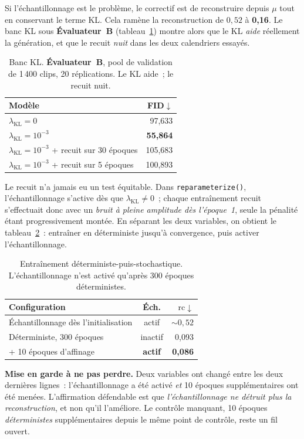 \documentclass[12pt,a4paper,oneside]{report}
\theoremstyle{definition}
\theoremstyle{plain}
\newcommand{\rc}{\mathrm{rc}}
\newcommand{\lkl}{\ensuremath{\lambda_{\mathrm{KL}}}}
\begin{document}
Si l'échantillonnage est le problème, le correctif est de reconstruire depuis
$\mu$ tout en conservant le terme KL. Cela ramène la reconstruction de $0{,}52$ à
\textbf{0,16}. Le banc KL sous \textbf{Évaluateur~B} (tableau~\ref{tab:klbench})
montre alors que le KL \emph{aide} réellement la génération, et que le recuit
\emph{nuit} dans les deux calendriers essayés.

\begin{table}[ht]
\centering
\caption{Banc KL. \textbf{Évaluateur~B}, pool de validation de 1\,400 clips, 20
réplications. Le KL aide~; le recuit nuit.}
\label{tab:klbench}
\small
\begin{tabular}{@{}lr@{}}
\toprule
Modèle & FID$\downarrow$ \\
\midrule
$\lkl=0$ & 97,633 \\
$\lkl=10^{-3}$ & \textbf{55,864} \\
$\lkl=10^{-3}$ + recuit sur 30 époques & 105,683 \\
$\lkl=10^{-3}$ + recuit sur 5 époques & 100,893 \\
\bottomrule
\end{tabular}
\end{table}

Le recuit n'a jamais eu un test équitable. Dans \texttt{reparameterize()},
l'échantillonnage s'active dès que $\lkl\neq0$~; chaque entraînement recuit
s'effectuait donc avec un \emph{bruit à pleine amplitude dès l'époque~1}, seule la
pénalité étant progressivement montée. En séparant les deux variables, on obtient
le tableau~\ref{tab:detstoch}~: entraîner en déterministe jusqu'à convergence,
puis activer l'échantillonnage.

\begin{table}[ht]
\centering
\caption{Entraînement déterministe-puis-stochastique. L'échantillonnage n'est
activé qu'après 300 époques déterministes.}
\label{tab:detstoch}
\small
\begin{tabular}{@{}lcr@{}}
\toprule
Configuration & Éch. & $\rc\downarrow$ \\
\midrule
Échantillonnage dès l'initialisation & actif & ${\sim}0,52$ \\
Déterministe, 300 époques & inactif & 0,093 \\
\quad + 10 époques d'affinage & \textbf{actif} & \textbf{0,086} \\
\bottomrule
\end{tabular}
\end{table}

\begin{encadre}
\textbf{Mise en garde à ne pas perdre.} Deux variables ont changé entre les deux
dernières lignes~: l'échantillonnage a été activé \emph{et} 10 époques
supplémentaires ont été menées. L'affirmation défendable est que
\emph{l'échantillonnage ne détruit plus la reconstruction}, et non qu'il
l'améliore. Le contrôle manquant, 10 époques \emph{déterministes}
supplémentaires depuis le même point de contrôle, reste un fil ouvert.
\end{encadre}
\end{document}
